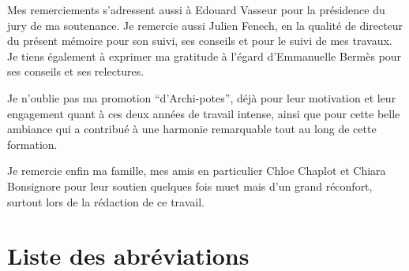 \documentclass[12pt,twoside]{book}
\begin{document}
Mes remerciements s'adressent aussi à Edouard Vasseur pour la présidence du jury de ma soutenance. Je remercie aussi Julien Fenech, en la qualité de directeur du présent mémoire pour son suivi, ses conseils et pour le suivi de mes travaux. Je tiens également à exprimer ma gratitude à l'égard d'Emmanuelle Bermès pour ses conseils et ses relectures.

Je n'oublie pas ma promotion \enquote{d'Archi-potes}, déjà pour leur motivation et leur engagement quant à ces deux années de travail intense, ainsi que pour cette belle ambiance qui a contribué à une harmonie remarquable tout au long de cette formation. 

Je remercie enfin ma famille, mes amis en particulier Chloe Chaplot et Chiara Bonsignore pour leur soutien quelques fois muet mais d'un grand réconfort, surtout lors de la rédaction de ce travail.
	\newpage{\pagestyle{empty}\cleardoublepage}
	

\chapter{Liste des abréviations}
\end{document}
